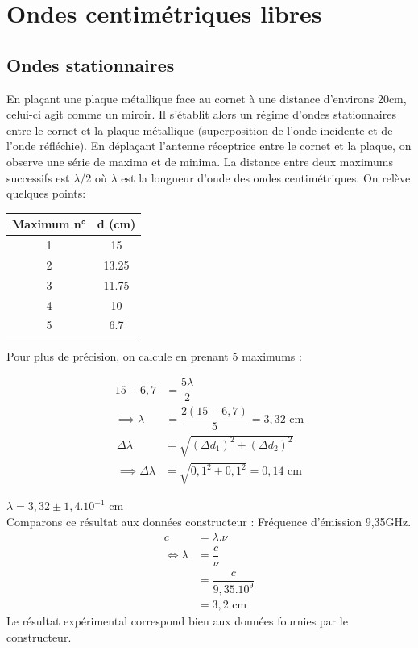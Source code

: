 \documentclass[12pt,a4paper]{article}
\begin{document}
	\section{Ondes centimétriques libres}
	\subsection{Ondes stationnaires}
	En plaçant une plaque métallique face au cornet à une distance d'environs 20cm, celui-ci agit comme un miroir. Il s'établit alors un régime d'ondes stationnaires entre le cornet et la plaque métallique (superposition de l'onde incidente et de l'onde réfléchie). En déplaçant l'antenne réceptrice entre le cornet et la plaque, on observe une série de maxima et de minima. La distance entre deux maximums successifs est $\lambda$/2 où $\lambda$ est la longueur d'onde des ondes centimétriques. On relève quelques points:
	\begin{center}
		\begin{tabular}{|c|c|}
			\hline 
			Maximum n° & d (cm) \\ 
			\hline 
			1 & 15 \\ 
			\hline 
			2 & 13.25 \\ 
			\hline 
			3 & 11.75 \\ 
			\hline 
			4 & 10 \\ 
			\hline 
			5 & 6.7 \\ 
			\hline 
		\end{tabular} 
	\end{center}
	Pour plus de précision, on calcule en prenant 5 maximums : 
	\setlength\columnseprule{0.5pt}
	\begin{multicols}{2}
		\begin{align*}
		15-6,7 &= \dfrac{5\lambda}{2}\\
		\implies \lambda &= \dfrac{2(15-6,7)}{5}=3,32 \text{ cm}
		\end{align*}
		\vfill
		\columnbreak
		\begin{align*}
		\Delta \lambda &= \sqrt {\left( \Delta d_{1}\right) ^{2}+\left( \Delta d_{2}\right) ^{2}}\\
		\implies \Delta \lambda &= \sqrt {0,1^2+0,1^2}=0,14 \text{ cm}
		\end{align*}
	\end{multicols}
	$\lambda = 3,32\pm1,4.10^{-1}$ cm\\
	Comparons ce résultat aux données constructeur : Fréquence d'émission 9,35GHz.
	\begin{align*}
	c &= \lambda.\nu\\
	\iff \lambda &= \dfrac{c}{\nu}\\
	&=\dfrac{c}{9,35.10^9}\\
	&=3,2 \text{ cm}
	\end{align*}
	Le résultat expérimental correspond bien aux données fournies par le constructeur. 
	
\end{document}
